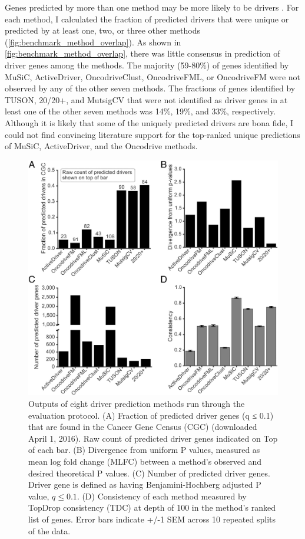 Genes predicted by more than one method may be more likely to be drivers \cite{RN96}. For each method, I calculated the fraction of predicted drivers that were unique or predicted by at least one, two, or three other methods (\autoref{fig:benchmark_method_overlap}). As shown in \autoref{fig:benchmark_method_overlap}, there was little consensus in prediction of driver genes among the methods. The majority (59-80\%) of genes identified by MuSiC, ActiveDriver, OncodriveClust, OncodriveFML, or OncodriveFM were not observed by any of the other seven methods. The fractions of genes identified by TUSON, 20/20+, and MutsigCV that were not identified as driver genes in at least one of the other seven methods was 14\%, 19\%, and 33\%, respectively. Although it is likely that some of the uniquely predicted drivers are bona fide, I could not find convincing literature support for the top-ranked unique predictions of MuSiC, ActiveDriver, and the Oncodrive methods. 

\begin{figure}
  \centering
  \makeatletter
  \let\@currsize\normalsize
  \includegraphics[width=0.9\linewidth]{figures/chapter4/evaluation.jpg}
  \caption{Outputs of eight driver prediction methods run through the evaluation protocol. (A) Fraction of predicted driver genes (q ≤ 0.1) that are found in the Cancer Gene Census (CGC) (downloaded April 1, 2016). Raw count of predicted driver genes indicated on Top of each bar. (B) Divergence from uniform P values, measured as mean log fold change (MLFC) between a method's observed and desired theoretical P values. (C) Number of predicted driver genes. Driver gene is defined as having Benjamini-Hochberg adjusted P value, $q \leq 0.1$. (D) Consistency of each method measured by TopDrop consistency (TDC) at depth of 100 in the method's ranked list of genes. Error bars indicate +/-1 SEM across 10 repeated splits of the data.}
  \label{fig:benchmark_result}
\end{figure}

